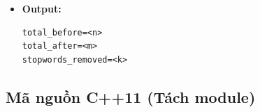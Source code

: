 \begin{itemize}
\begin{itemize}
\begin{itemize}
            \item In summary:
\begin{lstlisting}
total_before=<n>
total_after=<m>
stopwords_removed=<k>
\end{lstlisting}
        \end{itemize}

    \end{itemize}

    \item \textbf{Output:}

\begin{lstlisting}
total_before=<n>
total_after=<m>
stopwords_removed=<k>
\end{lstlisting}

\end{itemize}

\subsection{Mã nguồn C++11 (Tách module)}

